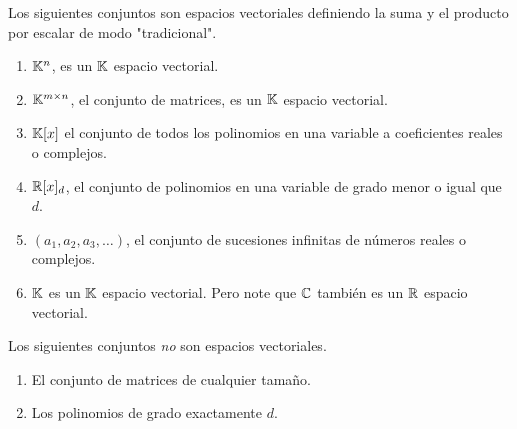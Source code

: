 \begin{ejemplo}
Los siguientes conjuntos son espacios vectoriales definiendo la suma y el producto por escalar de modo "tradicional".
\begin{enumerate}
\item $\mathbb K^n$, es un $\mathbb K$ espacio vectorial.
\item $\mathbb K^{m \times n}$, el conjunto de matrices, es un $\mathbb K$ espacio vectorial.
\item $\mathbb K[x]$ el conjunto de todos los polinomios en una variable a coeficientes reales o complejos.
\item $\mathbb R[x]_d$, el conjunto de polinomios en una variable de grado menor o igual que $d$.
\item $(a_1, a_2, a_3, \dots)$, el conjunto de sucesiones infinitas de números reales o complejos.
\item $\mathbb K$ es un $\mathbb K$ espacio vectorial. Pero note que $\mathbb C$ tambi\'en es un $\mathbb R$ espacio vectorial.
\end{enumerate}

Los siguientes conjuntos \emph{no} son espacios vectoriales.
\begin{enumerate}
\item El conjunto de matrices de cualquier tamaño.
\item Los polinomios de grado exactamente $d$.
\end{enumerate}
\end{ejemplo}

